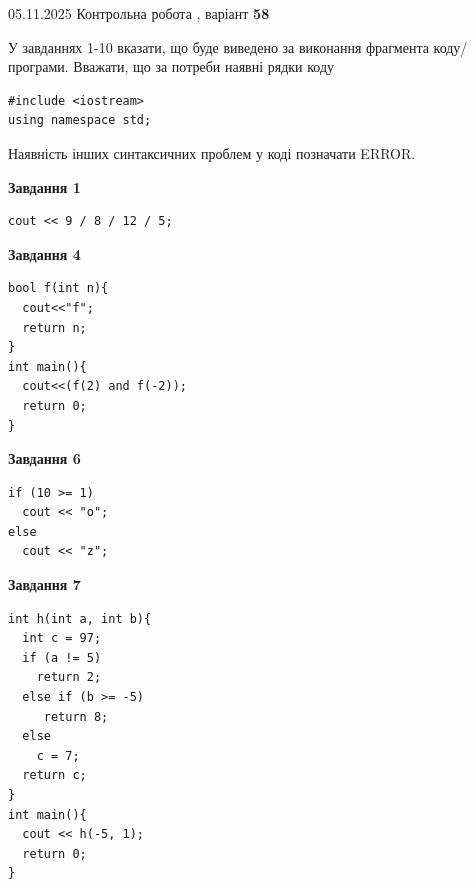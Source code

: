 \documentclass[12pt, ukrainian]{article}
\begin{document}
{\Large{05.11.2025 Контрольна робота , варіант  \No \textbf { 58 }\par}}
{
\begin {large}
У завданнях 1-10 вказати, що буде виведено за виконання фрагмента коду/про\-гра\-ми.
Вважати, що за потреби наявні рядки коду
\begin{verbatim}
#include <iostream>
using namespace std;
\end{verbatim}
Наявність інших синтаксичних проблем у коді позначати ERROR.

\begin{minipage}[t]{7.0cm}

\begin{center}
\textbf{Завдання 1}
\end{center}
\vspace{-8mm}

\begin{verbatim}
cout << 9 / 8 / 12 / 5;
\end{verbatim}



\begin{center}
\textbf{Завдання 4}
\end{center}
\vspace{-8mm}

\begin{verbatim}
bool f(int n){
  cout<<"f";
  return n;
}
int main(){
  cout<<(f(2) and f(-2));
  return 0;
}
\end{verbatim}



\begin{center}
\textbf{Завдання 6}
\end{center}
\vspace{-8mm}

\begin{verbatim}
if (10 >= 1)
  cout << "o";
else
  cout << "z";
\end{verbatim}



\begin{center}
\textbf{Завдання 7}
\end{center}
\vspace{-8mm}

\begin{verbatim}
int h(int a, int b){
  int c = 97;
  if (a != 5)
    return 2;
  else if (b >= -5)
     return 8;
  else
    c = 7;
  return c;
}
int main(){
  cout << h(-5, 1);
  return 0;
}
\end{verbatim}


\end{minipage}
\end{large}}
\end{document}

